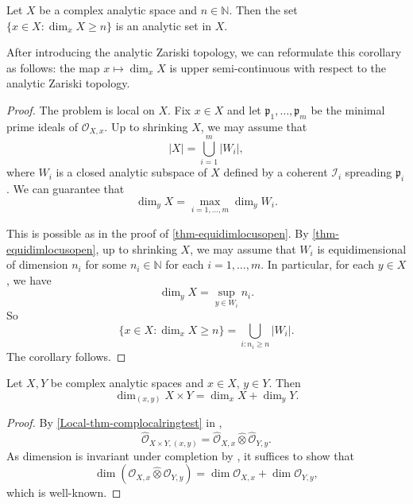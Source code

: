 \begin{corollary}
    Let $X$ be a complex analytic space and $n\in \mathbb{N}$. Then the set $\{x\in X:\dim_x X\geq n\}$ is an analytic set in $X$.

\end{corollary}
After introducing the analytic Zariski topology, we can reformulate this corollary as follows: the map $x\mapsto \dim_x X$ is upper semi-continuous with respect to the analytic Zariski topology.
\begin{proof}
    The problem is local on $X$. Fix $x\in X$ and let $\mathfrak{p}_1,\ldots,\mathfrak{p}_m$ be the minimal prime ideals of $\mathcal{O}_{X,x}$. Up to shrinking $X$, we may assume that 
    \[
        |X|=\bigcup_{i=1}^m |W_i|,  
    \]
    where $W_i$ is a closed analytic subspace of $X$ defined by a coherent $\mathcal{I}_i$ spreading $\mathfrak{p}_i$. We can guarantee that
    \[
        \dim_y X=\max_{i=1,\ldots,m}\dim_y W_i.   
    \]
    
    This is possible as in the proof of \cref{thm-equidimlocusopen}. By \cref{thm-equidimlocusopen}, up to shrinking $X$, we may assume that $W_i$ is equidimensional of dimension $n_i$ for some $n_i\in \mathbb{N}$ for each $i=1,\ldots,m$. In particular, for each $y\in X$, we have
    \[
        \dim_y X=\sup_{y\in W_i} n_i.  
    \]
    So 
    \[
        \{x\in X:\dim_x X\geq n\}=\bigcup_{i: n_i\geq n} |W_i|.  
    \]
    The corollary follows.
\end{proof}

\begin{proposition}
    Let $X,Y$ be complex analytic spaces and $x\in X$, $y\in Y$. Then
    \[
        \dim_{(x,y)}X\times Y=\dim_x X+\dim_y Y.  
    \]
\end{proposition}
\begin{proof}
    By \cref{Local-thm-complocalringtest} in ,
    \[
        \hat{\mathcal{O}}_{X\times Y,(x,y)}=\hat{\mathcal{O}}_{X,x}\hat{\otimes}\hat{\mathcal{O}}_{Y,y}.  
    \]
    As dimension is invariant under completion by \cite[\href{https://stacks.math.columbia.edu/tag/07NV}{Tag 07NV}]{stacks-project}, it suffices to show that
    \[
        \dim (\mathcal{O}_{X,x}\hat{\otimes} \mathcal{O}_{Y,y}) =\dim \mathcal{O}_{X,x}+\dim \mathcal{O}_{Y,y}, 
    \]
    which is well-known.
\end{proof}

